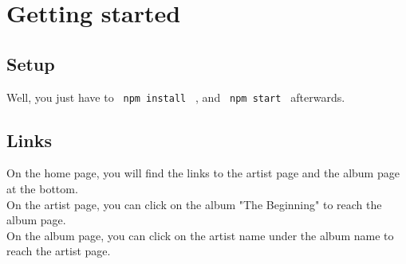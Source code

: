 \documentclass[11pt]{article}
\begin{document}
        

    \section{Getting started}
    
        \subsection{Setup}
    
        \noindent
        Well, you just have to \texttt{ npm install } , and \texttt{ npm start } afterwards.
        
        \subsection{Links}
        
		\noindent
		On the home page, you will find the links to the artist page and the album page at the bottom. \\
		On the artist page, you can click on the album "The Beginning" to reach the album page. \\
		On the album page, you can click on the artist name under the album name to reach the artist page.
\end{document}
